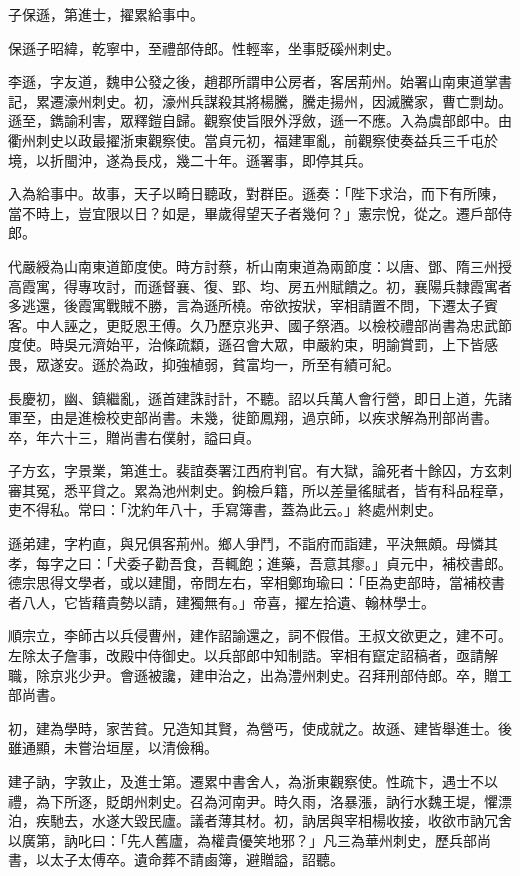 \begin{pinyinscope}
 子保遜，第進士，擢累給事中。



 保遜子昭緯，乾寧中，至禮部侍郎。性輕率，坐事貶磎州刺史。



 李遜，字友道，魏申公發之後，趙郡所謂申公房者，客居荊州。始署山南東道掌書記，累遷濠州刺史。初，濠州兵謀殺其將楊騰，騰走揚州，因滅騰家，曹亡剽劫。遜至，鐫諭利害，眾釋鎧自歸。觀察使旨限外浮斂，遜一不應。入為虞部郎中。由衢州刺史以政最擢浙東觀察使。當貞元初，福建軍亂，前觀察使奏益兵三千屯於境，以折閩沖，遂為長戍，幾二十年。遜署事，即停其兵。



 入為給事中。故事，天子以畸日聽政，對群臣。遜奏：「陛下求治，而下有所陳，當不時上，豈宜限以日？如是，畢歲得望天子者幾何？」憲宗悅，從之。遷戶部侍郎。



 代嚴綬為山南東道節度使。時方討蔡，析山南東道為兩節度：以唐、鄧、隋三州授高霞寓，得專攻討，而遜督襄、復、郢、均、房五州賦饋之。初，襄陽兵隸霞寓者多逃還，後霞寓戰賊不勝，言為遜所橈。帝欲按狀，宰相請置不問，下遷太子賓客。中人誣之，更貶恩王傅。久乃歷京兆尹、國子祭酒。以檢校禮部尚書為忠武節度使。時吳元濟始平，治條疏纇，遜召會大眾，申嚴約束，明諭賞罰，上下皆感畏，眾遂安。遜於為政，抑強植弱，貧富均一，所至有績可紀。



 長慶初，幽、鎮繼亂，遜首建誅討計，不聽。詔以兵萬人會行營，即日上道，先諸軍至，由是進檢校吏部尚書。未幾，徙節鳳翔，過京師，以疾求解為刑部尚書。卒，年六十三，贈尚書右僕射，謚曰貞。



 子方玄，字景業，第進士。裴誼奏署江西府判官。有大獄，論死者十餘囚，方玄刺審其冤，悉平貸之。累為池州刺史。鉤檢戶籍，所以差量徭賦者，皆有科品程章，吏不得私。常曰：「沈約年八十，手寫簿書，蓋為此云。」終處州刺史。



 遜弟建，字杓直，與兄俱客荊州。鄉人爭鬥，不詣府而詣建，平決無頗。母憐其孝，每字之曰：「犬委子勸吾食，吾輒飽；進藥，吾意其瘳。」貞元中，補校書郎。德宗思得文學者，或以建聞，帝問左右，宰相鄭珣瑜曰：「臣為吏部時，當補校書者八人，它皆藉貴勢以請，建獨無有。」帝喜，擢左拾遺、翰林學士。



 順宗立，李師古以兵侵曹州，建作詔諭還之，詞不假借。王叔文欲更之，建不可。左除太子詹事，改殿中侍御史。以兵部郎中知制誥。宰相有竄定詔稿者，亟請解職，除京兆少尹。會遜被讒，建申治之，出為澧州刺史。召拜刑部侍郎。卒，贈工部尚書。



 初，建為學時，家苦貧。兄造知其賢，為營丐，使成就之。故遜、建皆舉進士。後雖通顯，未嘗治垣屋，以清儉稱。



 建子訥，字敦止，及進士第。遷累中書舍人，為浙東觀察使。性疏卞，遇士不以禮，為下所逐，貶朗州刺史。召為河南尹。時久雨，洛暴漲，訥行水魏王堤，懼漂泊，疾馳去，水遂大毀民廬。議者薄其材。初，訥居與宰相楊收接，收欲市訥冗舍以廣第，訥叱曰：「先人舊廬，為權貴優笑地邪？」凡三為華州刺史，歷兵部尚書，以太子太傅卒。遺命葬不請鹵簿，避贈謚，詔聽。



\end{pinyinscope}